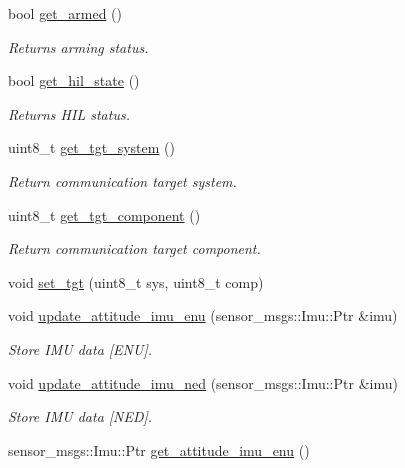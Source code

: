 \begin{DoxyCompactItemize}
bool \mbox{\hyperlink{group__nodelib_gae941bfe1ef1afd1cb6608028a38e1c27}{get\+\_\+armed}} ()
\begin{DoxyCompactList}\small\item\em Returns arming status. \end{DoxyCompactList}\item 
bool \mbox{\hyperlink{group__nodelib_gae6fe5bb4dc5d02536c8b7970577b22d7}{get\+\_\+hil\+\_\+state}} ()
\begin{DoxyCompactList}\small\item\em Returns H\+IL status. \end{DoxyCompactList}\item 
uint8\+\_\+t \mbox{\hyperlink{group__nodelib_ga9d8412c7b6aada6715ded8eefcd6a517}{get\+\_\+tgt\+\_\+system}} ()
\begin{DoxyCompactList}\small\item\em Return communication target system. \end{DoxyCompactList}\item 
uint8\+\_\+t \mbox{\hyperlink{group__nodelib_ga1b874777bb6378d1fec2d3498f95884c}{get\+\_\+tgt\+\_\+component}} ()
\begin{DoxyCompactList}\small\item\em Return communication target component. \end{DoxyCompactList}\item 
void \mbox{\hyperlink{group__nodelib_ga87eb84159321497e07dc4c739bdb727d}{set\+\_\+tgt}} (uint8\+\_\+t sys, uint8\+\_\+t comp)
\item 
void \mbox{\hyperlink{group__nodelib_gaca39c9b4dfce83909e2bde0796564341}{update\+\_\+attitude\+\_\+imu\+\_\+enu}} (sensor\+\_\+msgs\+::\+Imu\+::\+Ptr \&imu)
\begin{DoxyCompactList}\small\item\em Store I\+MU data \mbox{[}E\+NU\mbox{]}. \end{DoxyCompactList}\item 
void \mbox{\hyperlink{group__nodelib_gacd6fc1ac631a90619d7f53fa5ab9b29d}{update\+\_\+attitude\+\_\+imu\+\_\+ned}} (sensor\+\_\+msgs\+::\+Imu\+::\+Ptr \&imu)
\begin{DoxyCompactList}\small\item\em Store I\+MU data \mbox{[}N\+ED\mbox{]}. \end{DoxyCompactList}\item 
sensor\+\_\+msgs\+::\+Imu\+::\+Ptr \mbox{\hyperlink{group__nodelib_ga191709b6e50268022d10e469a3897975}{get\+\_\+attitude\+\_\+imu\+\_\+enu}} ()

\end{DoxyCompactItemize}
